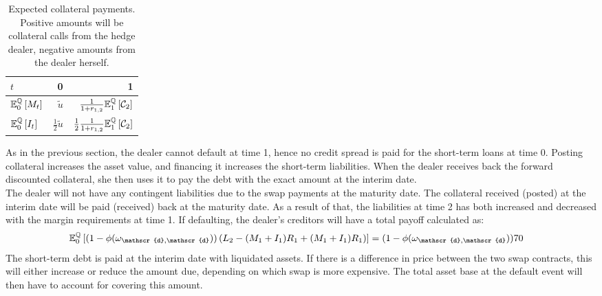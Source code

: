 \documentclass[main.tex]{subfiles}
\begin{document}
            \begin{table}[H]
                \centering
                \begin{tabular}{l|rr}
                    $t$ & 0 & 1 \\
                    \hline
                    \rule{0pt}{1.3em}
                    $\mathbb{E}_{0}^{\mathbb{Q}}\left[M_t\right]$ & $\tilde{u}$ & $\frac{1}{1+r_{1,2}}\mathbb{E}_{1}^{\mathbb{Q}}\left[\mathcal{C}_{2}\right]$ \\
                    \rule{0pt}{1.3em}
                    $\mathbb{E}_{0}^{\mathbb{Q}}\left[I_t\right]$ & $\frac{1}{2}\tilde{u}$ & $\frac{1}{2}\frac{1}{1+r_{1,2}}\mathbb{E}_{1}^{\mathbb{Q}}\left[\mathcal{C}_{2}\right]$ \\
                \end{tabular}
                \caption{
                    Expected collateral payments. 
                    Positive amounts will be collateral calls from the hedge dealer,
                    negative amounts from the dealer herself.
                }
                \label{tbl:swap-margin-postings}
            \end{table}

            As in the previous section, the dealer cannot default at time 1,
            hence no credit spread is paid for the short-term loans at time 0.
            Posting collateral increases the asset value,
            and financing it increases the short-term liabilities.
            When the dealer receives back the forward discounted collateral,
            she then uses it to pay the debt with the exact amount at the interim date.
            \\
            The dealer will not have any contingent liabilities due to the swap payments at the maturity date.
            The collateral received (posted) at the interim date will be paid (received) back at the maturity date.
            As a result of that,
            the liabilities at time 2 has both increased and decreased with the margin requirements at time 1.
            If defaulting, the dealer's creditors will have a total payoff calculated as:
            \begin{align}
                \mathbb{E}_{0}^{\rnmeasure}\left[
                    (1-\phi(\omega_{\mathscr{d},\mathscr{d}}))\left(
                        L_{2}
                        -(M_1+I_1)R_{1}
                        +(M_1+I_1)R_{1}
                    \right)
                \right] 
                &= (1-\phi(\omega_{\mathscr{d},\mathscr{d}}))\num{70}
            \end{align}
            The short-term debt is paid at the interim date with liquidated assets.
            If there is a difference in price between the two swap contracts,
            this will either increase or reduce the amount due,
            depending on which swap is more expensive.
            The total asset base at the default event will then have to account for covering this amount. 
\end{document}
